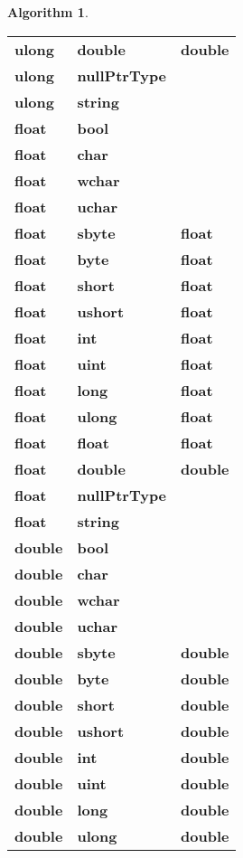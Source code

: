 \documentclass[a4paper,oneside,11pt]{book}
\theoremstyle{definition}
\newtheorem{algo}{Algorithm}[section]
\begin{document}
\begin{algo}
\begin{flushleft}
\begin{supertabular}{lll}
\textbf{ulong}& \textbf{double}& \textbf{double}\\
\textbf{ulong}& \textbf{nullPtrType}& \\
\textbf{ulong}& \textbf{string}& \\
\hline
\textbf{float}& \textbf{bool}& \\
\textbf{float}& \textbf{char}& \\
\textbf{float}& \textbf{wchar}& \\
\textbf{float}& \textbf{uchar}& \\
\textbf{float}& \textbf{sbyte}& \textbf{float}\\
\textbf{float}& \textbf{byte}& \textbf{float}\\
\textbf{float}& \textbf{short}& \textbf{float}\\
\textbf{float}& \textbf{ushort}& \textbf{float}\\
\textbf{float}& \textbf{int}& \textbf{float}\\
\textbf{float}& \textbf{uint}& \textbf{float}\\
\textbf{float}& \textbf{long}& \textbf{float}\\
\textbf{float}& \textbf{ulong}& \textbf{float}\\
\textbf{float}& \textbf{float}& \textbf{float}\\
\textbf{float}& \textbf{double}& \textbf{double}\\
\textbf{float}& \textbf{nullPtrType}& \\
\textbf{float}& \textbf{string}& \\
\hline
\textbf{double}& \textbf{bool}& \\
\textbf{double}& \textbf{char}& \\
\textbf{double}& \textbf{wchar}& \\
\textbf{double}& \textbf{uchar}& \\
\textbf{double}& \textbf{sbyte}& \textbf{double}\\
\textbf{double}& \textbf{byte}& \textbf{double}\\
\textbf{double}& \textbf{short}& \textbf{double}\\
\textbf{double}& \textbf{ushort}& \textbf{double}\\
\textbf{double}& \textbf{int}& \textbf{double}\\
\textbf{double}& \textbf{uint}& \textbf{double}\\
\textbf{double}& \textbf{long}& \textbf{double}\\
\textbf{double}& \textbf{ulong}& \textbf{double}\\

\end{supertabular}
\end{flushleft}
\end{algo}
\end{document}
